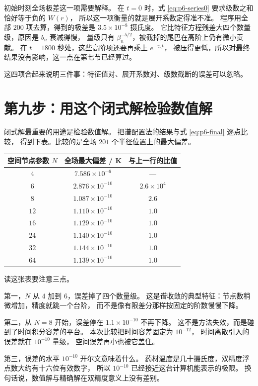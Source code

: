 初始时刻全场极差这一项需要解释。
在 $t=0$ 时，式 \eqref{eq:p6-series0} 要求级数之和恰好等于负的 $W(r)$，
所以这一项衡量的就是展开系数定得准不准。
程序用全部 $200$ 项去算，得到的极差是 $3.5\times10^{-8}$ 摄氏度。
它比特征方程残差大四个数量级，原因是 $b_n$ 衰减得慢，
量级只有 $\beta_n^{-5/2}$，被截掉的尾巴在高阶上仍有微小贡献。
在 $t=1800$ 秒处，这些高阶项还要再乘上 $e^{-\gamma_nt}$，
被压得更低，所以对最终结果没有影响，这一点在第七节已经算过。

这四项合起来说明三件事：特征值对、展开系数对、级数截断的误差可以忽略。

\section{第九步：用这个闭式解检验数值解}

闭式解最重要的用途是检验数值解。
把谱配置法的结果与式 \eqref{eq:p6-final} 逐点比较，
得到下表。比较的是全场 $201$ 个半径位置上的最大偏差。

\begin{center}
\begin{tabular}{@{}ccc@{}}
\toprule
空间节点参数 $N$ & 全场最大偏差 / K & 与上一行的比值 \\
\midrule
$4$ & $7.586\times10^{-6}$ & --- \\
$6$ & $2.876\times10^{-10}$ & $2.6\times10^{4}$ \\
$8$ & $1.087\times10^{-10}$ & $2.6$ \\
$12$ & $1.110\times10^{-10}$ & $1.0$ \\
$16$ & $1.129\times10^{-10}$ & $1.0$ \\
$24$ & $1.140\times10^{-10}$ & $1.0$ \\
$32$ & $1.144\times10^{-10}$ & $1.0$ \\
$64$ & $1.139\times10^{-10}$ & $1.0$ \\
\bottomrule
\end{tabular}
\end{center}

读这张表要注意三点。

第一，$N$ 从 $4$ 加到 $6$，误差掉了四个数量级。
这是谱收敛的典型特征：节点数稍微增加，精度就跳一个台阶，
而不是像有限差分那样按固定的阶数慢慢下降。

第二，从 $N=8$ 开始，误差停在 $1.1\times10^{-10}$ 不再下降。
这不是方法失效，而是碰到了时间积分容差的平台。
本次比较把时间容差固定为 $10^{-12}$，
时间离散引入的误差就在 $10^{-10}$ 量级，
空间误差再小也被它盖住。

第三，误差的水平 $10^{-10}$ 开尔文意味着什么。
药材温度是几十摄氏度，双精度浮点数大约有十六位有效数字，
所以 $10^{-10}$ 已经接近这台计算机能表示的极限。
换句话说，数值解与精确解在双精度意义上没有差别。

